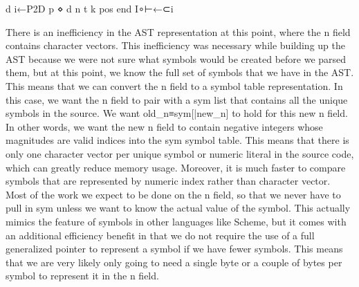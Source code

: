\documentclass{article}%
\begin{document}
\nwenddocs{}\plusendmoddef\nwstartdeflinemarkup{}\nwenddeflinemarkup
d i←P2D p ⋄ d n t k pos end I∘⊢←⊂i
\nwendcode{}\nwdocspar

There is an inefficiency in the AST representation at this point,
where the {\Tt{}n\nwendquote} field contains character vectors.
This inefficiency was necessary while building up the AST because
we were not sure what symbols would be created
before we parsed them,
but at this point, we know the full set of symbols that we have in 
the AST.
This means that we can convert the {\Tt{}n\nwendquote} field to a symbol table 
representation.
In this case, we want the {\Tt{}n\nwendquote} field to pair with a {\Tt{}sym\nwendquote} list
that contains all the unique symbols in the source.
We want {\Tt{}old{\_}n≡sym[|new{\_}n]\nwendquote} to hold for this new {\Tt{}n\nwendquote} field.
In other words, we want the new {\Tt{}n\nwendquote} field to contain negative 
integers whose magnitudes are valid indices into the {\Tt{}sym\nwendquote} 
symbol table.
This means that there is only one character vector per unique symbol
or numeric literal in the source code, which can greatly reduce 
memory usage.
Moreover, it is much faster to compare symbols that are represented by 
numeric index rather than character vector.
Most of the work we expect to be done on the {\Tt{}n\nwendquote} field, so that we 
never have to pull in {\Tt{}sym\nwendquote} unless we want to know the actual value 
of the symbol.
This actually mimics the feature of symbols in other languages
like Scheme,
but it comes with an additional efficiency benefit in that we do not
require the use of a full generalized pointer to represent a symbol
if we have fewer symbols. 
This means that we are very likely only going to need a single byte 
or a couple of bytes per symbol to represent it in the {\Tt{}n\nwendquote} field.
\end{document}
